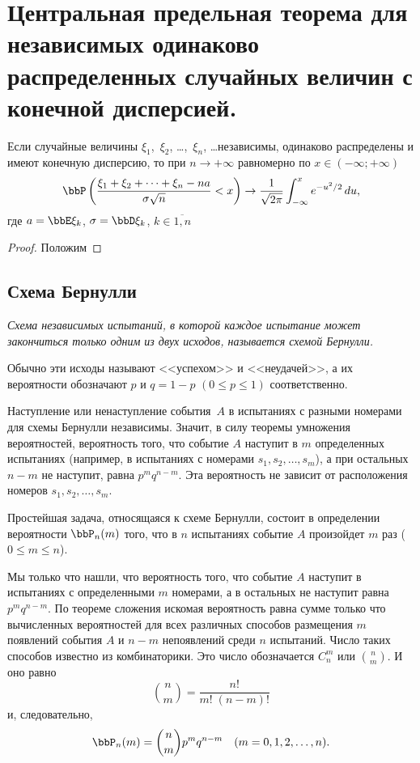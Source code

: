 \chapter{Центральная предельная теорема для независимых одинаково распределенных случайных величин с конечной дисперсией.}

\begin{thm}
Если случайные величины $\xi_1$,~$\xi_2$, \dots,~$\xi_n$, \dots независимы, одинаково распределены и имеют конечную дисперсию, то при $n\to +\infty$ равномерно по $x\in(-\infty;+\infty)$
$$
\bbP \left(\frac{\xi_1+\xi_2+\dots+\xi_n -na}{\sigma \sqrt{n}} < x\right) \to \frac{1}{\sqrt{2\pi}}\int_{-\infty}^{x} e^{-u^2/2}\,du,
$$
где $a = \bbE \xi_k$, $\sigma = \bbD\xi_k$, $k\in\overline{1,n}$
\end{thm}

\begin{proof}
Положим 

\end{proof}


\iffalse
\section{Схема Бернулли}

\textit{Схема независимых испытаний, в которой каждое испытание может закончиться только одним из двух исходов, называется схемой Бернулли.}

Обычно эти исходы называют <<успехом>> и <<неудачей>>, а их вероятности обозначают $p$ и $q = 1 - p$ $(0 \le p \le 1)$ соответственно.

Наступление или ненаступление события~$A$ в испытаниях с разными номерами для схемы Бернулли независимы. Значит, в силу теоремы умножения вероятностей, вероятность того, что событие $A$ наступит в $m$ определенных испытаниях (например, в испытаниях с номерами $s_1, s_2, \ldots, s_m$), а при остальных $n - m$ не наступит, равна $p^mq^{n - m}$. Эта вероятность не зависит от  расположения номеров $s_1, s_2, \ldots, s_m$.

Простейшая задача, относящаяся к схеме Бернулли, состоит в определении вероятности $\bbP_n(m)$ того, что в $n$ испытаниях событие $A$ произойдет $m$ раз ($0 \le m \le n$).

Мы только что нашли, что вероятность того, что событие $A$ наступит в испытаниях с определенными $m$ номерами, а в остальных не наступит равна $p^mq^{n - m}$. По теореме сложения искомая вероятность равна сумме только что вычисленных вероятностей для всех различных способов размещения $m$ появлений события $A$ и $n - m$ непоявлений среди $n$ испытаний. Число таких способов известно из комбинаторики. Это число обозначается  $C_n^m$ или $\binom n m $. И оно равно	
$$
\binom n m = \frac{n!}{m!\;(n - m)!}
$$
и, следовательно,
\begin{equation} \label{ch32.1.1eq1}
\bbP_n(m) = \binom n m p^mq^{n - m} \quad (m = 0,1,2,\ldots,n).
\end{equation}

